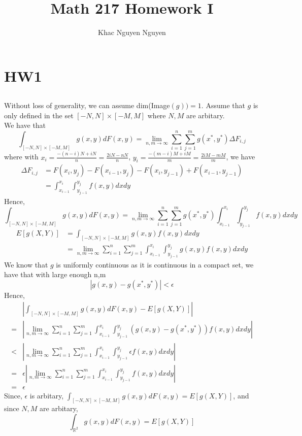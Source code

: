 \documentclass[11pt]{report}
\title{\textbf{Math 217 Homework I}}
\author{Khac Nguyen Nguyen}
\date{}
\begin{document}
\tableofcontents
\newpage
\chapter{HW1}
\section{}
Without loss of generality, we can assume dim(Image$(g)) = 1$.
Assume that $g$ is only defined in the set $[-N,N] \times [-M,M]$ where $N,M$ are arbitary. \\
We have that 
\[
    \int_{[-N,N] \times [-M,M]} g(x,y) dF(x,y) = \lim_{n,m \to \infty} \sum_{i=1}^n \sum_{j=1}^m g(x^*, y^*) \Delta F_{i,j}
\]
where with $x_i = \frac{-(n-i)N + iN}{n} = \frac{2iN - nN}{n}$, $y_i = \frac{-(m-i)M + iM}{m} = \frac{2iM - mM}{m}$, we have
\begin{equation*}
    \begin{aligned}
        \Delta F_{i,j} &= F(x_i, y_j) - F(x_{i-1}, y_j) - F(x_i, y_{j-1}) + F(x_{i-1}, y_{j-1}) \\
        &= \int_{x_{i-1}}^{x_i} \int_{y_{j-1}}^{y_j} f(x,y) dxdy
    \end{aligned}
\end{equation*}
Hence, 
\[
    \int_{[-N,N] \times [-M,M]} g(x,y) dF(x,y) = \lim_{n,m \to \infty} \sum_{i=1}^n \sum_{j=1}^m g(x^*, y^*) \int_{x_{i-1}}^{x_i} \int_{y_{j-1}}^{y_j} f(x,y) dxdy
\]
\begin{equation*}
    \begin{aligned}
        E[g(X,Y)] &= \int_{[-N,N] \times [-M,M]} g(x,y) f(x,y) dxdy \\
        &=  \lim_{n,m \to \infty} \sum_{i=1}^n \sum_{j=1}^m \int_{x_{i-1}}^{x_i} \int_{y_{j-1}}^{y_j} g(x, y) f(x,y) dxdy 
    \end{aligned}
\end{equation*}
We know that $g$ is uniformly continuous as it is continuous in a compact set, we have that with large enough n,m
\[
    | g(x,y) - g(x^*, y^*) | < \epsilon
\]
Hence, 
\begin{equation*}
    \begin{aligned}
        & \left| \int_{[-N,N] \times [-M,M]} g(x,y) dF(x,y)  - E[g(X,Y)] \right| \\
        =&  \left| \lim_{n,m \to \infty} \sum_{i=1}^n \sum_{j=1}^m  \int_{x_{i-1}}^{x_i} \int_{y_{j-1}}^{y_j} (g(x, y) - g(x^*,y^*)) f(x,y)  dxdy \right| \\
        <& \left| \lim_{n,m \to \infty} \sum_{i=1}^n \sum_{j=1}^m  \int_{x_{i-1}}^{x_i} \int_{y_{j-1}}^{y_j} \epsilon f(x,y)  dxdy \right| \\
        =& \epsilon \left|\lim_{n,m \to \infty} \sum_{i=1}^n \sum_{j=1}^m  \int_{x_{i-1}}^{x_i} \int_{y_{j-1}}^{y_j} f(x,y)  dxdy \right| \\
        =& \epsilon
    \end{aligned}
\end{equation*}
Since, $\epsilon$ is arbitary, $\int_{[-N,N] \times [-M,M]} g(x,y) dF(x,y)  = E[g(X,Y)]$, and since $N,M$ are arbitary,
\[
    \int_{\mathbb{R}^2} g(x,y) dF(x,y)  = E[g(X,Y)]
\]
\pagebreak
\end{document}
